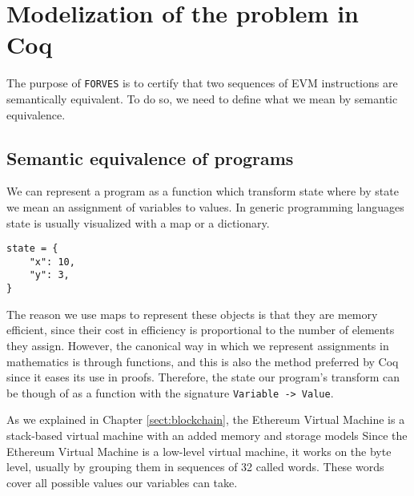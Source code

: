 \chapter{Modelization of the problem in Coq}
\label{cap:definitions}



The purpose of \texttt{FORVES} is to certify that two sequences of EVM instructions are 
semantically equivalent. To do so, we need to define what we mean by semantic equivalence.


\section{Semantic equivalence of programs}

We can represent a program as a function which transform state where by state we mean an assignment of 
variables to values. In generic programming languages state is usually visualized with a map or a
dictionary.

\begin{verbatim}
state = {
    "x": 10,
    "y": 3,
}
\end{verbatim}

The reason we use maps to represent these objects is that they are memory efficient, since their 
cost in efficiency is proportional to the number of elements they assign. However, the canonical 
way in which we represent assignments in mathematics is through functions, and this is also the 
method preferred by Coq since it eases its use in proofs. Therefore, the state our program's 
transform can be though of as a function with the signature \texttt{Variable -> Value}.

As we explained in Chapter \ref{sect:blockchain}, the Ethereum Virtual Machine is a stack-based
virtual machine with an added memory and storage models Since the Ethereum Virtual Machine is a 
low-level virtual machine, it works on the byte level, usually by grouping them in sequences of 
32 called words. These words cover all possible values our variables can take.

